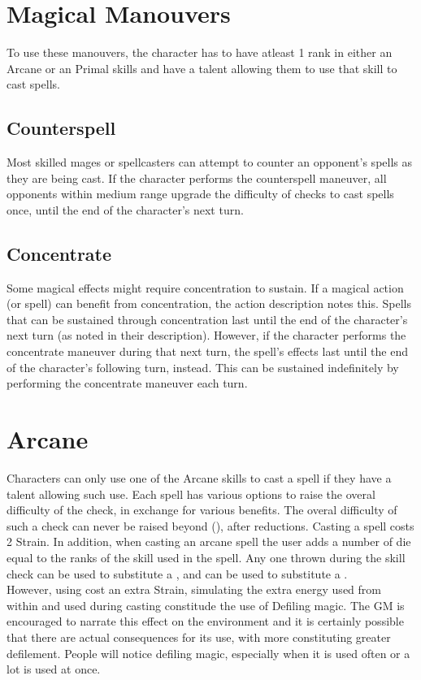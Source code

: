 \begin{multicols}{2}

\section{Magical Manouvers}
To use these manouvers, the character has to have atleast 1 rank in either
an Arcane or an Primal skills and have a talent allowing them to use that
skill to cast spells.

\subsection{Counterspell}
Most skilled mages or spellcasters can attempt to counter an opponent’s spells
as they are being cast. If the character performs the counterspell maneuver,
all opponents within medium range upgrade the difficulty of checks to cast
spells once, until the end of the character's next turn.

\subsection{Concentrate}
Some magical effects might require concentration to sustain. If a magical action
(or spell) can benefit from concentration, the action description notes this.
Spells that can be sustained through concentration last until the end of the
character's next turn (as noted in their description). However, if the character
performs the concentrate maneuver during that next turn, the spell’s effects last
until the end of the character’s following turn, instead. This can be sustained
indefinitely by performing the concentrate maneuver each turn.

\section{Arcane}
Characters can only use one of the Arcane skills to cast a spell if they have a talent
allowing such use. Each spell has various options to raise the overal difficulty
of the check, in exchange for various benefits. The overal difficulty of
such a check can never be raised beyond (\difficulty\difficulty\difficulty\difficulty\difficulty),
after reductions. Casting a spell costs 2 Strain. In addition, when casting an
arcane spell the user adds a number of \force die equal to the ranks of the skill
used in the spell. Any one \darklight thrown during the skill check can be used to
substitute a \advantage, and \darklight\darklight\darklight can be used to substitute
a \success.\\
However, using \light cost an extra Strain, simulating the extra energy used from
within and \dark used during casting constitude the use of Defiling magic. The GM
is encouraged to narrate this effect on the environment and it is certainly possible
that there are actual consequences for its use, with more \darklight constituting
greater defilement. People will notice defiling magic, especially when it is used
often or a lot \darklight is used at once.


\end{multicols}
